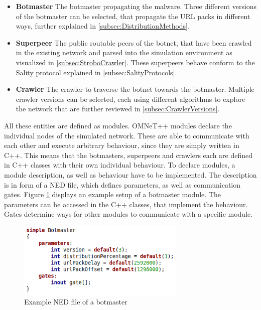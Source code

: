 \documentclass{article}
\begin{document}
\begin{itemize}
    \item \textbf{Botmaster}  The botmaster propagating the malware. Three different versions of the botmaster can be selected, that propagate the URL packs in different ways, further explained in \ref{subsec:DistributionMethods}.
    \item \textbf{Superpeer}  The public routable peers of the botnet, that have been crawled in the existing network and parsed into the simulation environment as visualized in \ref{subsec:StroboCrawler}. These superpeers behave conform to the Sality protocol explained in \ref{subsec:SalityProtocols}.
    \item \textbf{Crawler}  The crawler to traverse the botnet towards the botmaster. Multiple crawler versions can be selected, each using different algorithms to explore the network that are further reviewed in \ref{subsec:CrawlerVersions}.
\end{itemize}

All these entities are defined as modules. OMNeT++ modules declare the individual nodes of the simulated network. These are able to communicate with each other and execute arbitrary behaviour, since they are simply written in C++. This means that the botmasters, superpeers and crawlers each are defined in C++ classes with their own individual behaviour. To declare modules, a module description, as well as behaviour have to be implemented. The description is in form of a NED file, which defines parameters, as well as communication gates. Figure \ref{fig:BotmasterNED} displays an example setup of a botmaster module. The parameters can be accessed in the C++ classes, that implement the behaviour. Gates determine ways for other modules to communicate with a specific module. \\

\begin{figure}[H]
    \centering
    \includegraphics[width=8cm]{BotmasterNED.png}
    \caption{Example NED file of a botmaster}
    \label{fig:BotmasterNED}
\end{figure}
\end{document}
